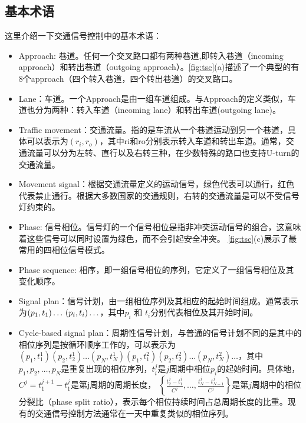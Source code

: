\subsection{基本术语}
这里介绍一下交通信号控制中的基本术语：
\begin{itemize}
    \item Approach: 巷道。任何一个交叉路口都有两种巷道,即转入巷道（incoming approach）和转出巷道（outgoing approach）。\autoref{fig:tsc}(a)描述了一个典型的有8个approach（四个转入巷道，四个转出巷道）的交叉路口。
    \item Lane：车道。一个Approach是由一组车道组成。与Approach的定义类似，车道也分为两种：转入车道（incoming lane）和转出车道(outgoing lane)。
    \item Traffic movement：交通流量。指的是车流从一个巷道运动到另一个巷道，具体可以表示为$\left(r_{i}, r_{o}\right)$，其中ri和ro分别表示转入车道和转出车道。通常，交通流量可以分为左转、直行以及右转三种，在少数特殊的路口也支持U-turn的交通流量。
    \item Movement signal：根据交通流量定义的运动信号，绿色代表可以通行，红色代表禁止通行。根据大多数国家的交通规则，右转的交通流量是可以不受信号灯约束的。
    \item Phase: 信号相位。信号灯的一个信号相位是指非冲突运动信号的组合，这意味着这些信号可以同时设置为绿色，而不会引起安全冲突。 \autoref{fig:tsc}(c)展示了最常用的四相位信号模式。
    \item Phase sequence: 相序，即一组信号相位的序列，它定义了一组信号相位及其变化顺序。
    \item Signal plan：信号计划，由一组相位序列及其相应的起始时间组成。通常表示为$\left(p_{1}, t_{1}\right) \ldots \\ \left(p_{i}, t_{i}\right) \ldots$，其中$p_{i}$ 和 $t_{i}$分别代表相位及其开始时间。
    \item Cycle-based signal plan：周期性信号计划，与普通的信号计划不同的是其中的相位序列是按循环顺序工作的，可以表示为
    $\left(p_{1}, t_{1}^{1}\right)\left(p_{2}, t_{2}^{1}\right) \ldots  \left(p_{N}, t_{N}^{1}\right)\left(p_{1}, t_{1}^{2}\right)\left(p_{2}, t_{2}^{2}\right) \ldots \left(p_{N}, t_{N}^{2}\right) \ldots$，其中$p_{1}, p_{2}, \ldots, p_{N}$是重复出现的相位序列，$t_i^j$是$j$周期中相位$p_i$的起始时间。具体地，$C^{j}=t_{1}^{j+1}-t_{1}^{j}$是第j周期的周期长度， $\left\{\frac{t_{2}^j-t_{1}^j}{C^j}, \ldots, \frac{t_{N}^j-t_{N-1}^j}{C^j}\right\}$是第$j$周期中的相位分裂比（phase split ratio），表示每个相位持续时间占总周期长度的比重。现有的交通信号控制方法通常在一天中重复类似的相位序列。
\end{itemize}


